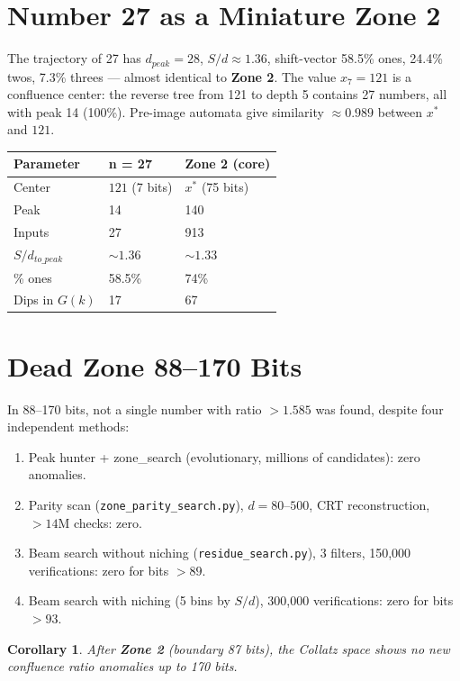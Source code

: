 \documentclass[12pt,a4paper]{article}
\newtheorem{corollary}[theorem]{Corollary}
\theoremstyle{remark}
\begin{document}
\section{Number 27 as a Miniature Zone 2}
The trajectory of 27 has $d_{peak}=28$, $S/d\approx1.36$, shift-vector 58.5\% ones, 24.4\% twos, 7.3\% threes --- almost identical to \textbf{Zone 2}. The value $x_7=121$ is a confluence center: the reverse tree from 121 to depth 5 contains 27 numbers, all with peak 14 (100\%). Pre-image automata give similarity $\approx0.989$ between $x^*$ and $121$.
\begin{table}[h]
\centering
\begin{tabular}{lll}
\toprule
\textbf{Parameter} & \textbf{n = 27} & \textbf{Zone 2 (core)} \\
\midrule
Center & $121$ (7 bits) & $x^*$ (75 bits) \\
Peak & 14 & 140 \\
Inputs & 27 & 913 \\
$S/d_{to\_peak}$ & $\sim 1.36$ & $\sim 1.33$ \\
\% ones & 58.5\% & 74\% \\
Dips in $G(k)$ & 17 & 67 \\
\bottomrule
\end{tabular}
\end{table}

\section{Dead Zone 88--170 Bits}
In 88--170 bits, not a single number with ratio $>1.585$ was found, despite four independent methods:
\begin{enumerate}
\item Peak hunter + zone\_search (evolutionary, millions of candidates): zero anomalies.
\item Parity scan (\texttt{zone\_parity\_search.py}), $d=80$--$500$, CRT reconstruction, $>14$M checks: zero.
\item Beam search without niching (\texttt{residue\_search.py}), 3 filters, 150,000 verifications: zero for bits $>89$.
\item Beam search with niching (5 bins by $S/d$), 300,000 verifications: zero for bits $>93$.
\end{enumerate}
\begin{corollary}
After \textbf{Zone 2} (boundary 87 bits), the Collatz space shows no new confluence \emph{ratio} anomalies up to 170 bits.
\end{corollary}
\end{document}
